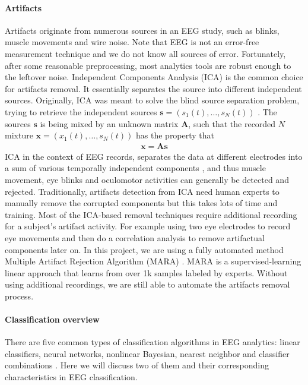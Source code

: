 \documentclass[a4paper,11pt,oneside]{article}
\begin{document}
\paragraph{Artifacts}
Artifacts originate from numerous sources in an EEG study, such as blinks, muscle movements and wire noise. Note that EEG is not an error-free measurement technique and we do not know all sources of error. Fortunately, after some reasonable preprocessing, most analytics tools are robust enough to the leftover noise. Independent Components Analysis (ICA) is the common choice for artifacts removal. It essentially separates the source into different independent sources. Originally, ICA was meant to solve the blind source separation problem, trying to retrieve the independent sources $ \mathbf{s} = ({s_1(t), \dots, s_N(t)})$ \cite{comon1994independent}. The sources $\mathbf{s}$ is being mixed by an unknown matrix $\mathbf{A}$, such that the recorded $N$ mixture $ \mathbf{x} = ({x_1(t), \dots, s_N(t)})$ has the property that 
\begin{align}
\mathbf{x = As}
\end{align} 
ICA in the context of EEG records, separates the data at different electrodes into a sum of various temporally independent components \cite{jung2000removing}, and thus muscle movement, eye blinks and oculomotor activities can generally be detected and rejected.  Traditionally, artifacts detection from ICA need human experts to manually remove the corrupted components but this takes lots of time and training. Most of the ICA-based removal techniques require additional recording for a subject's artifact activity. For example using two eye electrodes to record eye movements and then do a correlation analysis to remove artifactual  components later on. In this project, we are using a fully automated method  Multiple Artifact Rejection Algorithm (MARA) \cite{Winkler2011}. MARA is a supervised-learning linear approach that learns from over 1k samples labeled by experts. Without using additional recordings, we are still able to automate the artifacts removal process.  


\paragraph{Classification overview}
There are five common types of classification algorithms in EEG analytics: linear classifiers, neural networks, nonlinear Bayesian, nearest neighbor and classifier combinations \cite{lotte2007review}. Here we will discuss two of them and their corresponding characteristics in EEG classification.
\end{document}
